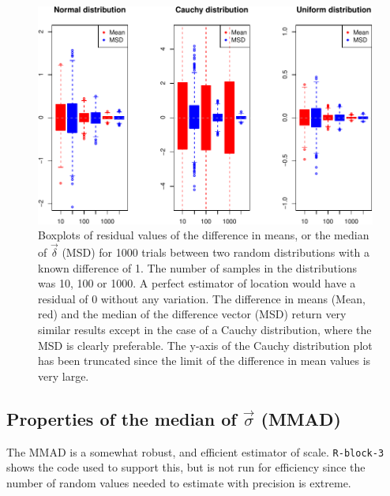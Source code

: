 \documentclass[onecolumn]{article}
\begin{document}
\begin{figure}
\centering
\includegraphics{effect_supplement_files/figure-latex/R-block-2-1.pdf}
\caption{Boxplots of residual values of the difference in means, or the
median of \(\vec{\delta}\) (MSD) for 1000 trials between two random
distributions with a known difference of 1. The number of samples in the
distributions was 10, 100 or 1000. A perfect estimator of location would
have a residual of 0 without any variation. The difference in means
(Mean, red) and the median of the difference vector (MSD) return very
similar results except in the case of a Cauchy distribution, where the
MSD is clearly preferable. The y-axis of the Cauchy distribution plot
has been truncated since the limit of the difference in mean values is
very large.}
\end{figure}

\hypertarget{properties-of-the-median-of-vecsigma-mmad}{%
\subsection{\texorpdfstring{Properties of the median of \(\vec{\sigma}\)
(MMAD)}{Properties of the median of \textbackslash{}vec\{\textbackslash{}sigma\} (MMAD)}}\label{properties-of-the-median-of-vecsigma-mmad}}

The MMAD is a somewhat robust, and efficient estimator of scale.
\texttt{R-block-3} shows the code used to support this, but is not run
for efficiency since the number of random values needed to estimate with
precision is extreme.
\end{document}
